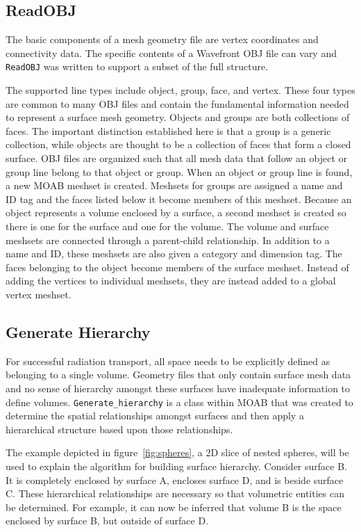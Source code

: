 \documentclass{anstrans}
\begin{document}
\subsection{ReadOBJ}
The basic components of a mesh geometry file are vertex coordinates and connectivity data.
The specific contents of a Wavefront OBJ file can vary \cite{obj} and \texttt{ReadOBJ}
was written to support a subset of the full structure. 

The supported line types include object, group, face, and vertex.  These four types are common
to many OBJ files and contain the fundamental information needed to represent a surface 
mesh geometry.  Objects and groups are both collections of faces.  The important distinction
established here is that a group is a generic collection, while objects are thought to be 
a collection of faces that form a closed surface.  OBJ files are organized such that all
mesh data that follow an object or group line belong to that object or group.  When an object
or group line is found, a new MOAB meshset is created.  Meshsets for groups are assigned
a name and ID tag and the faces listed below it become members of this meshset.  Because
an object represents a volume enclosed by a surface, a second meshset is created so there
is one for the surface and one for the volume.  The volume and surface meshsets are connected 
through a parent-child relationship.  In addition to a name and ID, these meshsets are also
given a category and dimension tag.  The faces belonging to the object become members of the
surface meshset.  Instead of adding the vertices to individual meshsets, they are instead
added to a global vertex meshset.

\subsection{Generate Hierarchy}
For successful radiation transport, all space needs to be explicitly defined as belonging 
to a single volume.  Geometry files that only contain surface mesh data and no sense of
hierarchy amongst these surfaces have inadequate information to define volumes.
\texttt{Generate\_hierarchy} is a class within MOAB \cite{genhi} that was created to
determine the spatial relationships amongst surfaces and then apply a hierarchical structure
based upon those relationships. 

The example depicted in figure~\ref{fig:spheres}, a 2D slice of nested spheres, will 
be used to explain the algorithm for building surface hierarchy. Consider surface B.
It is completely enclosed by surface A, encloses surface D, and is beside surface C. 
These hierarchical relationships are necessary so that volumetric entities can be
determined.  For example, it can now be inferred that volume B is the space enclosed 
by surface B, but outside of surface D.
\end{document}
